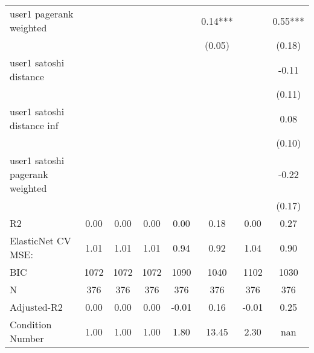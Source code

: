 \begin{table*}
\begin{center}
\begin{tabular}{lccccccc}
user1 pagerank weighted                        &          &            &         &         & 0.14***  &                    & 0.55***  \\
                                               &          &            &         &         & (0.05)   &                    & (0.18)   \\
user1 satoshi distance                         &          &            &         &         &          &                    & -0.11    \\
                                               &          &            &         &         &          &                    & (0.11)   \\
user1 satoshi distance inf                     &          &            &         &         &          &                    & 0.08     \\
                                               &          &            &         &         &          &                    & (0.10)   \\
user1 satoshi pagerank weighted                &          &            &         &         &          &                    & -0.22    \\
                                               &          &            &         &         &          &                    & (0.17)   \\
R2                                             & 0.00     & 0.00       & 0.00    & 0.00    & 0.18     & 0.00               & 0.27     \\
ElasticNet CV MSE:                             & 1.01     & 1.01       & 1.01    & 0.94    & 0.92     & 1.04               & 0.90     \\
BIC                                            & 1072     & 1072       & 1072    & 1090    & 1040     & 1102               & 1030     \\
N                                              & 376      & 376        & 376     & 376     & 376      & 376                & 376      \\
Adjusted-R2                                    & 0.00     & 0.00       & 0.00    & -0.01   & 0.16     & -0.01              & 0.25     \\
Condition Number                               & 1.00     & 1.00       & 1.00    & 1.80    & 13.45    & 2.30               & nan      \\
\hline
\end{tabular}
\end{center}
\end{table*}
